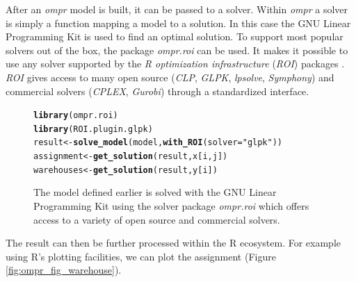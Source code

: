 \documentclass{optima}\usepackage[]{graphicx}\usepackage[]{color}
\makeatletter
\newcommand{\hlstr}[1]{\textcolor[rgb]{0.192,0.494,0.8}{#1}}%
\newcommand{\hlstd}[1]{\textcolor[rgb]{0.345,0.345,0.345}{#1}}%
\newcommand{\hlkwb}[1]{\textcolor[rgb]{0.69,0.353,0.396}{#1}}%
\newcommand{\hlkwc}[1]{\textcolor[rgb]{0.333,0.667,0.333}{#1}}%
\newcommand{\hlkwd}[1]{\textcolor[rgb]{0.737,0.353,0.396}{\textbf{#1}}}%
\newenvironment{kframe}{%
 \def\at@end@of@kframe{}%
 \ifinner\ifhmode%
  \def\at@end@of@kframe{\end{minipage}}%
  \begin{minipage}{\columnwidth}%
 \fi\fi%
 \def\FrameCommand##1{\hskip\@totalleftmargin \hskip-\fboxsep
 \colorbox{shadecolor}{##1}\hskip-\fboxsep
     \hskip-\linewidth \hskip-\@totalleftmargin \hskip\columnwidth}%
 \MakeFramed {\advance\hsize-\width
   \@totalleftmargin\z@ \linewidth\hsize
   \@setminipage}}%
 {\par\unskip\endMakeFramed%
 \at@end@of@kframe}
\newenvironment{knitrout}{}{} %
\makeatother
\begin{document}
After an \emph{ompr} model is built, it can be passed to a solver. Within \emph{ompr} a solver is simply a function mapping a model to a solution. In this case the GNU Linear Programming Kit \cite{glpk} is used to find an optimal solution. To support most popular solvers out of the box, the package \emph{ompr.roi} can be used. It makes it possible to use any solver supported by the \emph{R optimization infrastructure} (\emph{ROI}) packages \cite{roi}. \emph{ROI} gives access to many open source (\emph{CLP}, \emph{GLPK}, \emph{lpsolve}, \emph{Symphony}) and commercial solvers (\emph{CPLEX}, \emph{Gurobi}) through a standardized interface.

\begin{figure}[h]
\begin{small}
\begin{knitrout}
\color{fgcolor}\begin{kframe}
\begin{alltt}
\hlkwd{library}\hlstd{(ompr.roi)}
\hlkwd{library}\hlstd{(ROI.plugin.glpk)}
\hlstd{result} \hlkwb{<-} \hlkwd{solve_model}\hlstd{(model,} \hlkwd{with_ROI}\hlstd{(}\hlkwc{solver} \hlstd{=} \hlstr{"glpk"}\hlstd{))}
\hlstd{assignment} \hlkwb{<-} \hlkwd{get_solution}\hlstd{(result, x[i, j])}
\hlstd{warehouses} \hlkwb{<-} \hlkwd{get_solution}\hlstd{(result, y[i])}
\end{alltt}
\end{kframe}
\end{knitrout}
\end{small}
\caption{The model defined earlier is solved with the GNU Linear Programming Kit using the solver package \emph{ompr.roi} which offers access to a variety of open source and commercial solvers.}
\end{figure}

The result can then be further processed within the R ecosystem. For example using R's plotting facilities, we can plot the assignment (Figure \ref{fig:ompr_fig_warehouse}).
\end{document}
